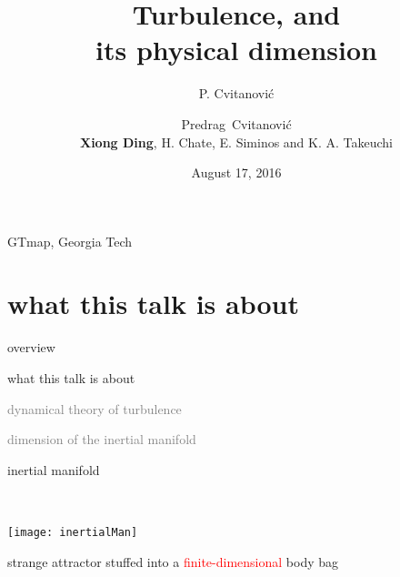 




\title{\huge Turbulence, and  \\ its physical dimension}
\author{P. Cvitanovi\'c}
\author[Cvitanovi\'c]
{
  \textcolor{green!50!black}{
  {Predrag~Cvitanovi\'c \\
  {\bf Xiong Ding}, H. Chate, E. Siminos and K. A. Takeuchi
  }	%
  }
}
\institute
{
GTmap, Georgia Tech
 }
\date{August 17, 2016}



\begin{frame}
  \titlepage
\end{frame}


\section[what this talk is about]
 {what this talk is about}

\begin{frame}{overview}
\begin{enumerate}
              \item {\Large
what this talk is about
                  }\textcolor{gray}{\small
              \item
dynamical theory of turbulence
              \item
\statesp
              \item
dimension of the inertial manifold
                    }
            \end{enumerate}
\end{frame}


\begin{frame}{}
    \begin{minipage}[b]{0.30\textwidth}
\begin{block}{inertial
 manifold
}
\end{block}
    \end{minipage}
~~~~~~
    \begin{minipage}[b]{0.60\textwidth}
\begin{center}
\texttt{[image: inertialMan]}
\end{center}
    \end{minipage}

\medskip
strange attractor stuffed into
a \textcolor{red}{\Large finite-dimensional} body bag
\end{frame}


